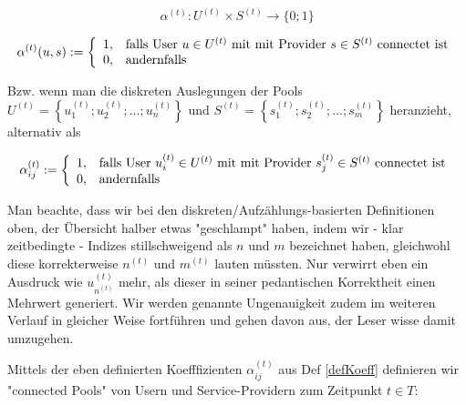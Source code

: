\begin{Def}\label{defKoeff}

\begin{equation*}
  \alpha^{(t)} : U^{(t)} \times S^{(t)} \rightarrow \{0; 1\} 
\end{equation*}

\[
\alpha^{(t)}(u, s):=\left\{%
\begin{array}{ll}
    1, & \hbox{falls User $u \in U^{(t)}$ mit mit Provider $s \in S^{(t)}$ connectet ist} \\
    0, & \hbox{andernfalls} \\
\end{array}%
\right.
\]

\vspace{1cm}

Bzw. wenn man die diskreten Auslegungen der Pools $U^{(t)} = \left\{ u^{(t)}_1; u^{(t)}_2;...; u^{(t)}_{n} \right\}$ und $S^{(t)} = \left\{ s^{(t)}_1; s^{(t)}_2;...; s^{(t)}_{m} \right\}$ heranzieht, alternativ als

\[
\alpha^{(t)}_{ij}:=\left\{%
\begin{array}{ll}
    1, & \hbox{falls User $u^{(t)}_i \in U^{(t)}$ mit mit Provider $s^{(t)}_j \in S^{(t)}$ connectet ist} \\
    0, & \hbox{andernfalls} \\
\end{array}%
\right.
\]

\end{Def}

\vspace{0.6cm}

Man beachte, dass wir bei den diskreten/Aufzählungs-basierten Definitionen oben, der Übersicht halber etwas "geschlampt" haben, indem wir - klar zeitbedingte - Indizes stillschweigend als $n$ und $m$ bezeichnet haben, gleichwohl diese korrekterweise $n^{(t)}$ und $m^{(t)}$ lauten müssten. Nur verwirrt eben ein Ausdruck wie $u^{(t)}_{n^{(t)}}$ mehr, als dieser in seiner pedantischen Korrektheit einen Mehrwert generiert. Wir werden genannte Ungenauigkeit zudem im weiteren Verlauf in gleicher Weise fortführen und gehen davon aus, der Leser wisse damit umzugehen. 

\vspace{0.3cm}

Mittels der eben definierten Koefffizienten $\alpha^{(t)}_{ij}$ aus Def \ref{defKoeff} definieren wir "connected Pools" von Usern und Service-Providern zum Zeitpunkt $t \in T$:



